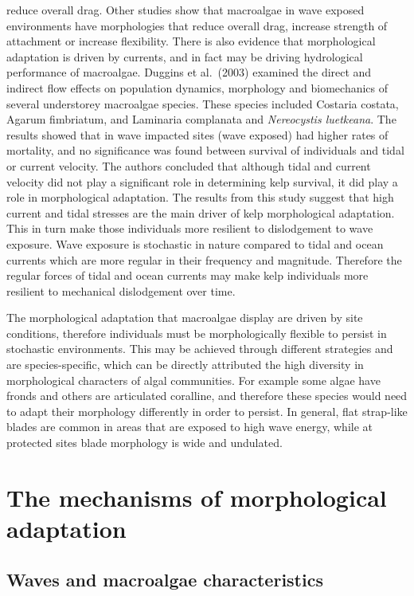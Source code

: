\documentclass[
]{article}
\begin{document}
reduce overall drag. Other studies show that macroalgae in wave exposed
environments have morphologies that reduce overall drag, increase
strength of attachment or increase flexibility. There is also evidence
that morphological adaptation is driven by currents, and in fact may be
driving hydrological performance of macroalgae. Duggins et al.~(2003)
examined the direct and indirect flow effects on population dynamics,
morphology and biomechanics of several understorey macroalgae species.
These species included Costaria costata, Agarum fimbriatum, and
Laminaria complanata and \emph{Nereocystis luetkeana}. The results
showed that in wave impacted sites (wave exposed) had higher rates of
mortality, and no significance was found between survival of individuals
and tidal or current velocity. The authors concluded that although tidal
and current velocity did not play a significant role in determining kelp
survival, it did play a role in morphological adaptation. The results
from this study suggest that high current and tidal stresses are the
main driver of kelp morphological adaptation. This in turn make those
individuals more resilient to dislodgement to wave exposure. Wave
exposure is stochastic in nature compared to tidal and ocean currents
which are more regular in their frequency and magnitude. Therefore the
regular forces of tidal and ocean currents may make kelp individuals
more resilient to mechanical dislodgement over time.

The morphological adaptation that macroalgae display are driven by site
conditions, therefore individuals must be morphologically flexible to
persist in stochastic environments. This may be achieved through
different strategies and are species-specific, which can be directly
attributed the high diversity in morphological characters of algal
communities. For example some algae have fronds and others are
articulated coralline, and therefore these species would need to adapt
their morphology differently in order to persist. In general, flat
strap-like blades are common in areas that are exposed to high wave
energy, while at protected sites blade morphology is wide and undulated.

\hypertarget{the-mechanisms-of-morphological-adaptation}{%
\section{The mechanisms of morphological
adaptation}\label{the-mechanisms-of-morphological-adaptation}}

\hypertarget{waves-and-macroalgae-characteristics}{%
\subsection{Waves and macroalgae
characteristics}\label{waves-and-macroalgae-characteristics}}
\end{document}
